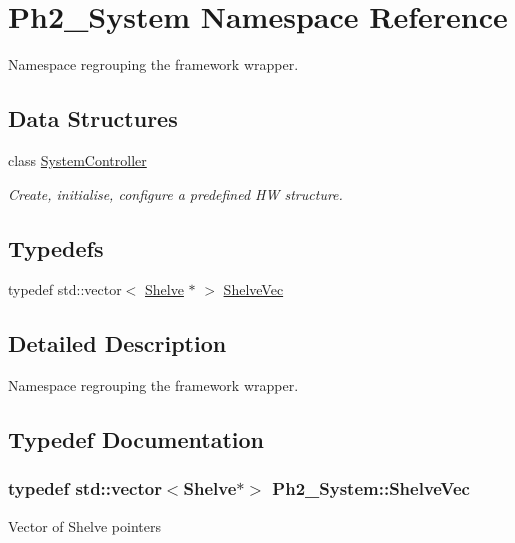 \hypertarget{namespace_ph2___system}{\section{Ph2\-\_\-\-System Namespace Reference}
\label{namespace_ph2___system}
}


Namespace regrouping the framework wrapper.  


\subsection*{Data Structures}
\begin{DoxyCompactItemize}
\item 
class \hyperlink{class_ph2___system_1_1_system_controller}{System\-Controller}
\begin{DoxyCompactList}\small\item\em Create, initialise, configure a predefined H\-W structure. \end{DoxyCompactList}\end{DoxyCompactItemize}
\subsection*{Typedefs}
\begin{DoxyCompactItemize}
\item 
typedef std\-::vector$<$ \hyperlink{class_ph2___hw_description_1_1_shelve}{Shelve} $\ast$ $>$ \hyperlink{namespace_ph2___system_a1c21eed494ab8a888694adf3de379dcf}{Shelve\-Vec}
\end{DoxyCompactItemize}


\subsection{Detailed Description}
Namespace regrouping the framework wrapper. 

\subsection{Typedef Documentation}
\hypertarget{namespace_ph2___system_a1c21eed494ab8a888694adf3de379dcf}{
\subsubsection[{Shelve\-Vec}]{\setlength{\rightskip}{0pt plus 5cm}typedef std\-::vector$<${\bf Shelve}$\ast$$>$ {\bf Ph2\-\_\-\-System\-::\-Shelve\-Vec}}}\label{namespace_ph2___system_a1c21eed494ab8a888694adf3de379dcf}
Vector of Shelve pointers 